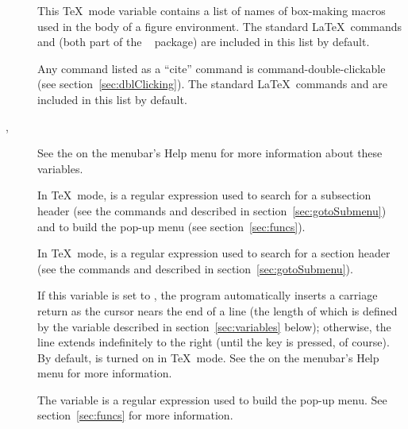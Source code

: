 \documentclass{report}
\begin{document}
\begin{description}
	\item[] This \TeX\ mode variable contains a list 
	of names of box-making macros used in the body of a figure 
	environment.  The standard \LaTeX\ commands  
	and  (both part of the \LaTeXe\ 
	 package) are included in this list by default.

	\item[] Any command listed as a ``cite'' command 
	is command-double-clickable (see section~\ref{sec:dblClicking}).  
	The standard \LaTeX\ commands \cmd{cite} and \cmd{nocite} are 
	included in this list by default.

	\item[, ] See the \acmd{Alpha
	Manual} on the menubar's Help menu for more information about these
	variables.

	\item[] In \TeX\ mode,  is a regular 
	expression used to search for a subsection header (see the 
	commands  and  
	described in section~\ref{sec:gotoSubmenu}) and to build the 
	 pop-up menu (see section~\ref{sec:funcs}).

	\item[] In \TeX\ mode,  is a 
	regular expression used to search for a section header (see the 
	commands  and  described in 
	section~\ref{sec:gotoSubmenu}).

	\item[] If this variable is set to , the
	program automatically inserts a carriage return as the cursor
	nears the end of a line (the length of which is defined by the
	variable  described in
	section~\ref{sec:variables} below); otherwise, the line extends
	indefinitely to the right (until the  key is pressed,
	of course).  By default,  is turned on in \TeX\
	mode.  See the  on the menubar's Help menu for
	more information.

	\item[] The variable  is a regular 
	expression used to build the  pop-up menu.  See 
	section~\ref{sec:funcs} for more information.


\end{description}
\end{document}
